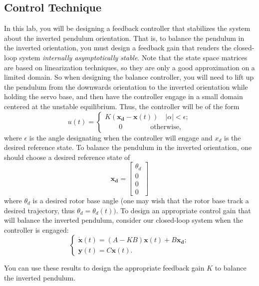\subsection{Control Technique}
In this lab, you will be designing a feedback controller that stabilizes the system about the inverted pendulum orientation. That is, to balance the pendulum in the inverted orientation, you must design a feedback gain that renders the closed-loop system \emph{internally asymptotically stable}. Note that the state space matrices are based on linearization techniques, so they are only a good approximation on a limited domain. So when designing the balance controller, you will need to lift up the pendulum from the downwards orientation to the inverted orientation while holding the servo base, and then have the controller engage in a small domain centered at the unstable equilibrium. Thus, the controller will be of the form
\[ u(t) =
    \begin{cases}
        K(\mathbf{x_d} - \mathbf{x}(t)) \quad |\alpha| < \epsilon; \\
        \quad \quad 0 \quad \quad \quad \quad \text{otherwise},
    \end{cases}
\]
where $\epsilon$ is the angle designating when the controller will engage and $x_d$ is the desired reference state. To balance the pendulum in the inverted orientation, one should choose a desired reference state of
\[
    \mathbf{x_d} =
    \left[\begin{array}{c}
            \theta_d \\
            0        \\
            0        \\
            0
        \end{array}\right]
\]
where $\theta_d$ is a desired rotor base angle (one may wish that the rotor base track a desired trajectory, thus $\theta_d=\theta_d(t))$. To design an appropriate control gain that will balance the inverted pendulum, consider our closed-loop system when the controller is engaged:
\begin{equation}
    \begin{cases}
        \mathbf{\dot{x}}(t) = \left(A-KB\right)\mathbf{x}(t) + B\mathbf{x_d}; \\
        \mathbf{y}(t) = C\mathbf{x}(t).
    \end{cases}
    \label{equation:lab3_feedback}
\end{equation}

You can use these results to design the appropriate feedback gain $K$ to balance the inverted pendulum.

